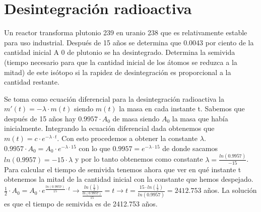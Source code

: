 
\section{Desintegración radioactiva}
\begin{ejer}
	Un reactor transforma plutonio 239 en uranio 238 que es relativamente estable para
	uso industrial. Después de 15 años se determina que 0.0043 por ciento de la cantidad
	inicial A 0 de plutonio se ha desintegrado. Determina la semivida (tiempo necesario
	para que la cantidad inicial de los átomos se reduzca a la mitad) de este isótopo si
	la rapidez de desintegración es proporcional a la cantidad restante.
\end{ejer}
\begin{sol}
	Se toma como ecuación diferencial para la desintegración radioactiva la $m'(t)=-\lambda \cdot m(t)$ siendo $m(t)$ la masa en cada instante t.  
	Sabemos que después de 15 años hay $0.9957 \cdot A_0$ de masa siendo $A_0$ la masa que había inicialmente.  
	Integrando la ecuación diferencial dada obtenemos que $m(t) = c\cdot e^{-\lambda \cdot t}$. Con esto procedemos a obtener la constante $\lambda$.  
	$0.9957\cdot A_0 = A_0\cdot e^{-\lambda \cdot 15}$ con lo que $0.9957 = e^{-\lambda \cdot 15}$ de donde sacamos $ln(0.9957) = -15\cdot \lambda$ y por lo tanto obtenemos como constante $\lambda = \frac{ln(0.9957)}{-15}$.  
	Para calcular el tiempo de semivida tenemos ahora que ver en qué instante t obtenemos la mitad de la cantidad inicial con la constante que hemos despejado.  
	$\frac{1}{2}\cdot A_0 = A_0\cdot e^{\frac{ln(0.9957)}{15}\cdot t} \rightarrow \frac{ln(\frac{1}{2})}{\frac{ln(0.9957)}{15}}=t \rightarrow t = \frac{15\cdot ln(\frac{1}{2})}{ln(0.9957)} = 2412.753$ años.  
	La solución es que el tiempo de semivida es de 2412.753 años.
\end{sol}